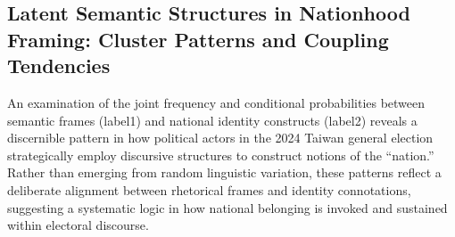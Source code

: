 \documentclass[man,12pt]{apa7}
\begin{document}
\subsection{Latent Semantic Structures in Nationhood Framing: Cluster Patterns and Coupling Tendencies}

An examination of the joint frequency and conditional probabilities between semantic frames (label1) and national identity constructs (label2) reveals a discernible pattern in how political actors in the 2024 Taiwan general election strategically employ discursive structures to construct notions of the ``nation.'' Rather than emerging from random linguistic variation, these patterns reflect a deliberate alignment between rhetorical frames and identity connotations, suggesting a systematic logic in how national belonging is invoked and sustained within electoral discourse.

\end{document}
